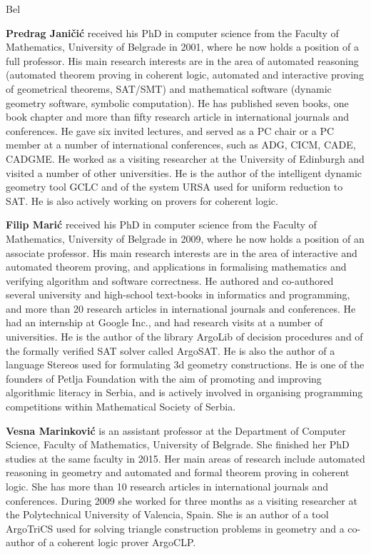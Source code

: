 \begin{sitedescription}{Bel}
\begin{compactitem}
  \item{\bf Predrag Janičić} received his PhD in computer science from
    the Faculty of Mathematics, University of Belgrade in 2001, where
    he now holds a position of a full professor. His main research
    interests are in the area of automated reasoning (automated
    theorem proving in coherent logic, automated and interactive
    proving of geometrical theorems, SAT/SMT) and mathematical
    software (dynamic geometry software, symbolic computation). He has
    published seven books, one book chapter and more than fifty
    research article in international journals and conferences. He
    gave six invited lectures, and served as a PC chair or a PC member
    at a number of international conferences, such as ADG, CICM, CADE,
    CADGME. He worked as a visiting researcher at the University of
    Edinburgh and visited a number of other universities. He is the
    author of the intelligent dynamic geometry tool GCLC and of the
    system URSA used for uniform reduction to SAT. He is also actively
    working on provers for coherent logic.

  \item{\bf Filip Marić} received his PhD in computer science from the
    Faculty of Mathematics, University of Belgrade in 2009, where he
    now holds a position of an associate professor. His main research
    interests are in the area of interactive and automated theorem
    proving, and applications in formalising mathematics and verifying
    algorithm and software correctness. He authored and co-authored
    several university and high-school text-books in informatics and
    programming, and more than 20 research articles in international
    journals and conferences. He had an internship at Google Inc., and
    had research visits at a number of universities. He is the author
    of the library ArgoLib of decision procedures and of the formally
    verified SAT solver called ArgoSAT. He is also the author of a
    language Stereos used for formulating 3d geometry
    constructions. He is one of the founders of Petlja Foundation with
    the aim of promoting and improving algorithmic literacy in Serbia,
    and is actively involved in organising programming competitions
    within Mathematical Society of Serbia.

  \item{\bf Vesna Marinković} is an assistant professor at the
    Department of Computer Science, Faculty of Mathematics, University
    of Belgrade. She finished her PhD studies at the same faculty in
    2015. Her main areas of research include automated reasoning in
    geometry and automated and formal theorem proving in coherent
    logic. She has more than 10 research articles in international
    journals and conferences. During 2009 she worked for three months
    as a visiting researcher at the Polytechnical University of
    Valencia, Spain. She is an author of a tool ArgoTriCS used for
    solving triangle construction problems in geometry and a co-author
    of a coherent logic prover ArgoCLP.


\end{compactitem}
\end{sitedescription}
